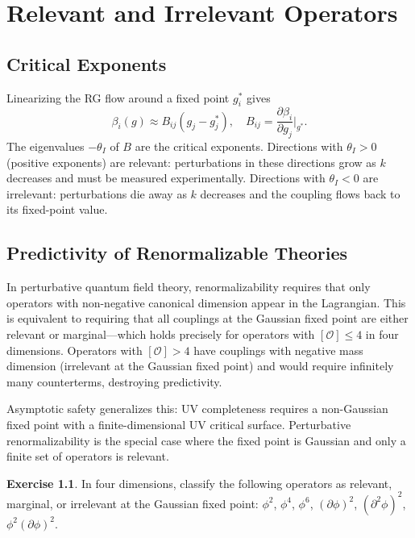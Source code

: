 \documentclass[12pt,a4paper,oneside]{book}
\theoremstyle{definition}
\newtheorem{exercise}{Exercise}[chapter]
\theoremstyle{plain}
\theoremstyle{remark}
\begin{document}
\chapter{Relevant and Irrelevant Operators}

\section{Critical Exponents}

Linearizing the RG flow around a fixed point $g^*_i$ gives
\begin{equation}
\beta_i(g) \approx B_{ij}(g_j - g_j^*), \quad
B_{ij} = \frac{\partial\beta_i}{\partial g_j}\bigg|_{g^*}.
\end{equation}
The eigenvalues $-\theta_I$ of $B$ are the critical exponents. Directions with
$\theta_I > 0$ (positive exponents) are relevant: perturbations in these
directions grow as $k$ decreases and must be measured experimentally.
Directions with $\theta_I < 0$ are irrelevant: perturbations die away as $k$
decreases and the coupling flows back to its fixed-point value.

\section{Predictivity of Renormalizable Theories}

In perturbative quantum field theory, renormalizability requires that only
operators with non-negative canonical dimension appear in the Lagrangian.
This is equivalent to requiring that all couplings at the Gaussian fixed point
are either relevant or marginal---which holds precisely for operators with
$[\mathcal{O}] \leq 4$ in four dimensions. Operators with $[\mathcal{O}] > 4$
have couplings with negative mass dimension (irrelevant at the Gaussian fixed
point) and would require infinitely many counterterms, destroying predictivity.

Asymptotic safety generalizes this: UV completeness requires a non-Gaussian
fixed point with a finite-dimensional UV critical surface. Perturbative
renormalizability is the special case where the fixed point is Gaussian and
only a finite set of operators is relevant.

\begin{exercise}
In four dimensions, classify the following operators as relevant, marginal,
or irrelevant at the Gaussian fixed point: $\phi^2$, $\phi^4$, $\phi^6$,
$(\partial\phi)^2$, $(\partial^2\phi)^2$, $\phi^2(\partial\phi)^2$.
\end{exercise}
\end{document}
